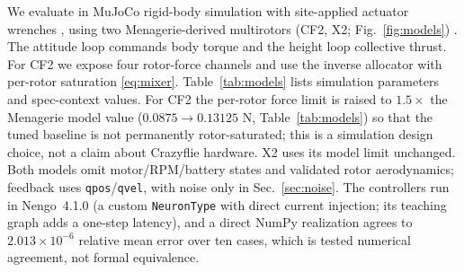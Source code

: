 \documentclass[letterpaper, 10 pt, conference]{ieeeconf}
\begin{document}
We evaluate in MuJoCo rigid-body simulation with site-applied actuator wrenches
\cite{todorov2012mujoco}, using two Menagerie-derived multirotors (CF2, X2; Fig.~\ref{fig:models})
\cite{menagerieModels}. The attitude loop commands body torque and the height loop
collective thrust. For CF2 we expose four rotor-force channels and use the inverse allocator with per-rotor saturation \eqref{eq:mixer}. Table~\ref{tab:models} lists simulation parameters and
spec-context values. For CF2 the per-rotor force limit is raised to $1.5\times$ the Menagerie model value ($0.0875\to0.13125$ N, Table~\ref{tab:models}) so that the tuned baseline is not permanently rotor-saturated; this is a simulation design choice, not a claim about Crazyflie hardware. X2 uses its model limit unchanged. Both models omit motor/RPM/battery states and validated rotor
aerodynamics; feedback uses \texttt{qpos}/\texttt{qvel}, with noise only in Sec.~\ref{sec:noise}. The controllers run in Nengo~4.1.0 (a custom \texttt{NeuronType} with direct current injection; its teaching graph adds a one-step latency), and a direct NumPy realization agrees to $2.013\times10^{-6}$ relative mean error over ten cases, which is tested numerical agreement, not formal equivalence.
%
\end{document}
